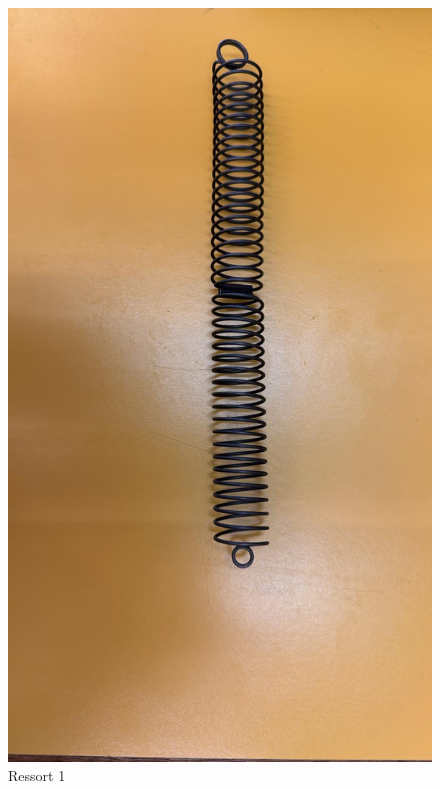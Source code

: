             \begin{figure}[h]
                \centering
                \begin{minipage}{0.31\textwidth}
                    \centering
                    \includegraphics[width=0.77\linewidth]{images/res2.jpeg}
                    \caption{Ressort 1}
                \end{minipage}
                \hfill
                \begin{minipage}{0.32\textwidth}
                    \centering

\end{minipage}
\end{figure}
